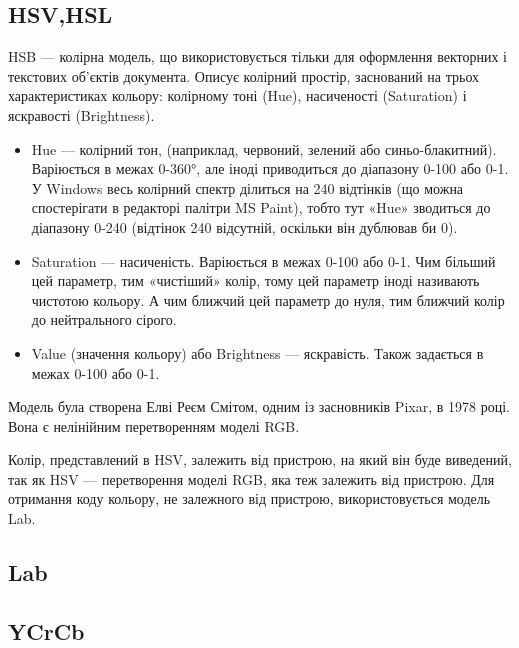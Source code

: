 \subsection{HSV,HSL}
HSB — колірна модель, що використовується тільки для оформлення векторних і текстових об'єктів документа. Описує колірний простір, заснований на трьох характеристиках кольору: колірному тоні (Hue), насиченості (Saturation) і яскравості (Brightness).

\begin{itemize}
	\item Hue — колірний тон, (наприклад, червоний, зелений або синьо-блакитний). Варіюється в межах 0-360°, але іноді приводиться до діапазону 0-100 або 0-1. У Windows весь колірний спектр ділиться на 240 відтінків (що можна спостерігати в редакторі палітри MS Paint), тобто тут «Hue» зводиться до діапазону 0-240 (відтінок 240 відсутній, оскільки він дублював би 0).

	\item Saturation — насиченість. Варіюється в межах 0-100 або 0-1. Чим більший цей параметр, тим «чистіший» колір, тому цей параметр іноді називають чистотою кольору. А чим ближчий цей параметр до нуля, тим ближчий колір до нейтрального сірого.
	
	\item Value (значення кольору) або Brightness — яскравість. Також задається в межах 0-100 або 0-1.
\end{itemize}

Модель була створена Елві Реєм Смітом, одним із засновників Pixar, в 1978 році. Вона є нелінійним перетворенням моделі RGB.

Колір, представлений в HSV, залежить від пристрою, на який він буде виведений, так як HSV — перетворення моделі RGB, яка теж залежить від пристрою. Для отримання коду кольору, не залежного від пристрою, використовується модель Lab.

\subsection{Lab}

\subsection{YCrCb}
